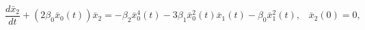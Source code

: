 \begin{equation}%
\frac{d\bar{x}_2}{dt} + \left( 2\beta_0 \bar{x}_0 (t) \right) \bar{x}_2
= - \beta_2 \bar{x}_0^4 (t) - 3\beta_1 \bar{x}_0^2 (t) \bar{x}_1 (t) -
\beta_0 \bar{x}_1^2 (t), \; \; \; \bar{x}_2 (0) = 0,
\end{equation}

